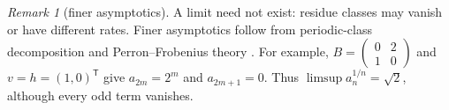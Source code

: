 \documentclass[reqno]{amsart}
\numberwithin{equation}{section}
\newtheorem{theorem}{Theorem}[section]
\newtheorem{corollary}[theorem]{Corollary}
\theoremstyle{definition}
\theoremstyle{remark}
\newtheorem{remark}[theorem]{Remark}
\DeclareMathOperator{\Ext}{Ext}
\newcommand{\UU}{\mathcal U}
\newcommand{\transpose}{^{\mathsf T}}
\begin{document}


\begin{remark}[finer asymptotics]
A limit need not exist: residue classes may vanish or have different rates. Finer asymptotics follow from periodic-class decomposition and Perron--Frobenius theory \cite{Rothblum75,SenetaNonnegative}. For example, \(B=\left(\begin{smallmatrix}0&2\\1&0\end{smallmatrix}\right)\) and \(v=h=(1,0)\transpose\) give \(a_{2m}=2^m\) and \(a_{2m+1}=0\). Thus \(\limsup a_n^{1/n}=\sqrt2\), although every odd term vanishes.
\end{remark}

\end{document}
